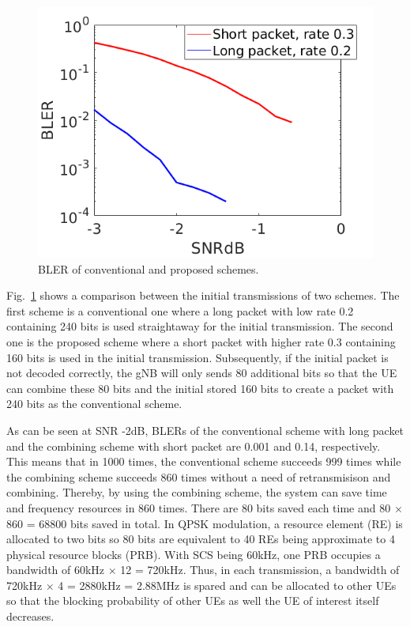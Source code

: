 \documentclass[conference,10pt]{IEEEtran}
\begin{document}
\begin{figure}[htbp]
\centerline{\includegraphics[scale=0.25]{fig8.png}}
\caption{BLER of conventional and proposed schemes.}
\label{fig8}
\end{figure}

Fig.~\ref{fig8} shows a comparison between the initial transmissions of two schemes. The first scheme is a conventional one where a long packet with low rate 0.2 containing 240 bits is used straightaway for the initial transmission. The second one is the proposed scheme where a short packet with higher rate 0.3 containing 160 bits is used in the initial transmission. Subsequently, if the initial packet is not decoded correctly, the gNB will only sends 80 additional bits so that the UE can combine these 80 bits and the initial stored 160 bits to create a packet with 240 bits as the conventional scheme. 

As can be seen at SNR -2dB, BLERs of the conventional scheme with long packet and the combining scheme with short packet are 0.001 and 0.14, respectively. This means that in 1000 times, the conventional scheme succeeds 999 times while the combining scheme succeeds 860 times without a need of retransmisison and combining. Thereby, by using the combining scheme, the system can save time and frequency resources in 860 times. There are 80 bits saved each time and 80 $\times$ 860 = 68800 bits saved in total. In QPSK modulation, a resource element (RE) is allocated to two bits so 80 bits are equivalent to 40 REs being approximate to 4 physical resource blocks (PRB). With SCS being 60kHz, one PRB occupies a bandwidth of 60kHz $\times$ 12 = 720kHz. Thus, in each transmission, a bandwidth of 720kHz $\times$ 4 = 2880kHz = 2.88MHz is spared and can be allocated to other UEs so that the blocking probability of other UEs as well the UE of interest itself decreases.
\end{document}
